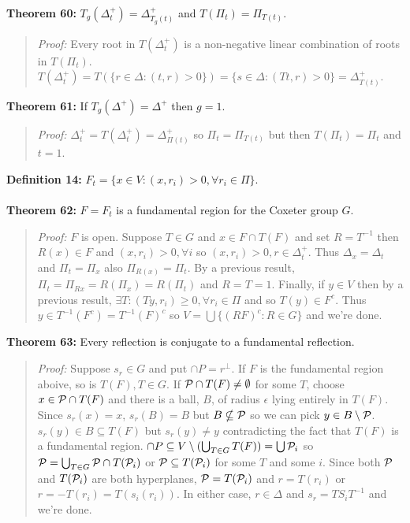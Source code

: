 {\bf Theorem 60:}
$T_g(\Delta_t^+)= \Delta_{T_g(t)}^+$ and $T(\Pi_t)= \Pi_{T(t)}$.
\begin{quote}
\emph{Proof:}  
Every root in $T(\Delta_t^+)$ is a non-negative linear combination of roots in
$T(\Pi_t)$.  $T(\Delta_t^+) = T(\{r \in \Delta: (t,r)>0 \})
= \{s \in \Delta: (Tt,r)>0 \} = \Delta_{T(t)}^+$.
\end{quote}
{\bf Theorem 61:}
If $T_g(\Delta^+)= \Delta^+$ then $g=1$.
\begin{quote}
\emph{Proof:}  
$\Delta_t^+ = T(\Delta_t^+)= \Delta_{\Pi(t)}^+$ so
$\Pi_t = \Pi_{T(t)}$ but then
$T( \Pi_t) = \Pi_t$ and $t=1$.
\end{quote}
{\bf Definition 14:}
$F_t= \{ x \in V: (x,r_i) > 0, \forall r_i \in \Pi \}$.
\\
\\
{\bf Theorem 62:}
$F= F_t$ is a fundamental region for the Coxeter group $G$.
\begin{quote}
\emph{Proof:}
$F$ is open.  Suppose $T \in G$ and $x \in F \cap T(F)$ and set $R= T^{-1}$ then
$R(x) \in F$ and $(x, r_i)>0, \forall i$ so $(x, r_i)>0, r \in \Delta_t^+$.
Thus $\Delta_x= \Delta_t$ and $\Pi_t= \Pi_x$ also $\Pi_{R(x)}= \Pi_t$.
By a previous result,
$\Pi_t= \Pi_{Rx}=R(\Pi_x )= R(\Pi_t )$ and $R=T=1$.  Finally, if $y \in V$ then by
a previous result, $\exists T: (Ty, r_i) \ge 0, \forall r_i \in \Pi$ and so
$T(y) \in F^c$.  Thus $y \in T^{-1}(F^c)= T^{-1}(F)^c$ so
$V= \bigcup \{ (RF)^c: R \in G \}$ and we're done.
\end{quote}
{\bf Theorem 63:}
Every reflection is conjugate to a fundamental reflection.
\begin{quote}
\emph{Proof:}
Suppose $s_r \in G$ and put ${\cap P}= r^{\perp}$.  If $F$ is the fundamental region
aboive, so is $T(F), T \in G$.  If 
${\cal P} \cap T(F) \ne \emptyset$ for some $T$,
choose $x \in {\cal P} \cap T(F)$ and there is a ball, $B$, of radius $\epsilon$ lying entirely in
$T(F)$.  Since $s_r(x)=x$, $s_r(B)=B$ but $B \nsubseteq {\cal P}$ so we can pick
$y \in B \setminus {\cal P}$.  $s_r(y) \in B \subseteq T(F)$ but $s_r(y) \ne y$ contradicting
the fact that $T(F)$ is a fundamental region.
${\cap P} \subseteq V \setminus (\bigcup_{T \in G} T(F)) = \bigcup {\cal P}_i$ so
${\cal P}= \bigcup_{T \in G} {\cal P} \cap T({\cal P}_i)$ or ${\cal P} \subseteq T({\cal P}_i)$
for some $T$ and some $i$.  Since both ${\cal P}$ and $T({\cal P}_i)$ are both hyperplanes,
${\cal P}= T({\cal P}_i)$ and $r= T(r_i)$ or $r= - T(r_i )= T(s_i(r_i))$.  In either case,
$r \in \Delta$ and $s_r= TS_i T^{-1}$ and we're done.
\end{quote}
